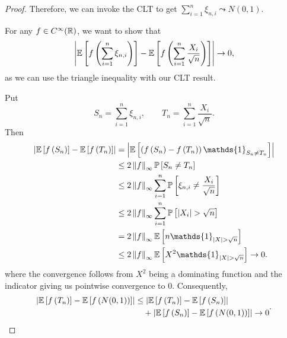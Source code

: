 \begin{proof}
	Therefore, we can invoke the CLT to get $\sum\limits_{i=1}^{n} \xi_{n,i} \leadsto N\left( 0,1 \right)$.

	For any $f\in C^\infty(\mathbb{R})$, we want to show that \[
		\left| \mathbb{E}\left[f\left( \sum\limits_{i=1}^{n} \xi_{n,i} \right)\right] - \mathbb{E}\left[f\left( \sum\limits_{i=1}^{n} \frac{X_i}{\sqrt{n} } \right)\right]  \right| \to 0
	,\] as we can use the triangle inequality with our CLT result.

	Put
	\[
		S_n = \sum\limits_{i=1}^{n} \xi_{n,i},
		\qquad
		T_n = \sum\limits_{i=1}^{n} \frac{X_i}{\sqrt{n}}.
	\]
	Then
	\begin{align*}
		\left| \E\left[f\left( S_n \right)\right] - \E\left[f\left( T_n \right)\right] \right|
		&= \left| \E\left[\left(f\left( S_n \right) - f\left( T_n \right)\right)\mathds{1}_{S_n \ne T_n} \right] \right| \\
		&\le 2\left\|f\right\|_{\infty} \P\left[S_n \ne T_n\right] \\
		&\le 2 \left\|f\right\|_\infty \sum\limits_{i=1}^{n} \P\left[\xi_{n,i} \ne \frac{X_i}{\sqrt{n} }\right] \\
		&\le 2 \left\|f\right\|_\infty \sum\limits_{i=1}^{n} \P\left[\left| X_i  \right| > \sqrt{n} \right] \\
		&= 2 \left\|f\right\|_{\infty} \E\left[n \mathds{1}_{\left| X \right| > \sqrt{n} }\right] \\
		&\le 2 \left\|f\right\|_{\infty} \E\left[X^2 \mathds{1}_{\left| X \right| > \sqrt{n} }\right] \to 0
	.\end{align*}
		where the convergence follows from $X^2$ being a dominating function and the indicator giving us pointwise convergence to $0$.
		Consequently, \[
			\begin{aligned}
				\left| \mathbb{E}\left[f\left( T_n \right)\right] - \mathbb{E}\left[f\left( N(0,1) \right)\right]  \right|
				&\le \left| \mathbb{E}\left[f\left( T_n \right)\right] - \mathbb{E}\left[f\left(S_n\right)\right] \right| \\
				&\quad + \left| \mathbb{E}\left[f\left(S_n\right)\right] - \mathbb{E}\left[f\left( N(0,1) \right)\right] \right| \to 0
			\end{aligned}
		.\] 
	\end{proof}

